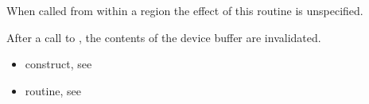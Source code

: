 When called from within a  region 
the effect of this routine is unspecified.

After a call to , the contents of the device
buffer are invalidated.

\crossreferences
\begin{itemize}
\item {} construct, see 
\item {} routine, see 
\end{itemize}

\ccppspecificend


